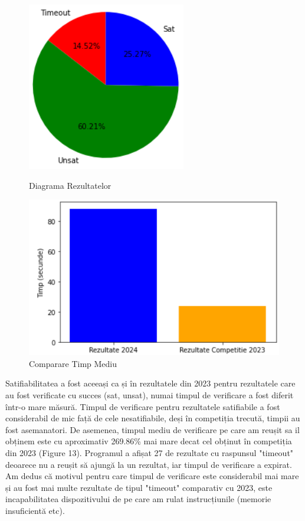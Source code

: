 \documentclass[12pt,a4paper]{article}
\theoremstyle{definition}
\theoremstyle{remark}
\begin{document}
\begin{figure}[!htb]
   \begin{minipage}{0.48\textwidth}
     \centering
     \includegraphics[width=.65\linewidth]{diag1.png}
     \caption{Diagrama Rezultatelor}\label{Fig:Data1}
   \end{minipage}\hfill
   \begin{minipage}{0.48\textwidth}
     \centering
     \includegraphics[width=1\linewidth]{diag2.png}
     \caption{Comparare Timp Mediu}\label{Fig:Data2}
   \end{minipage}
\end{figure}
Satifiabilitatea a fost aceeași ca și în rezultatele din 2023 pentru rezultatele care au fost verificate cu succes (sat, unsat), numai timpul de verificare a fost diferit într-o mare măsură. Timpul de verificare pentru rezultatele satifiabile a fost considerabil de mic față de cele nesatifiabile, deși în competiția trecută, timpii au fost asemanatori. De asemenea, timpul mediu de verificare pe care am reușit sa il obținem este cu aproximativ 269.86\% mai mare decat cel obținut în competiția din 2023 (Figure 13). Programul a afișat 27 de rezultate cu raspunsul "timeout" deoarece nu a reușit să ajungă la un rezultat, iar timpul de verificare a expirat. Am dedus că motivul pentru care timpul de verificare este considerabil mai mare și au fost mai multe rezultate de tipul "timeout" comparativ cu 2023, este incapabilitatea dispozitivului de pe care am rulat instrucțiunile (memorie insuficientă etc). \par
\end{document}
